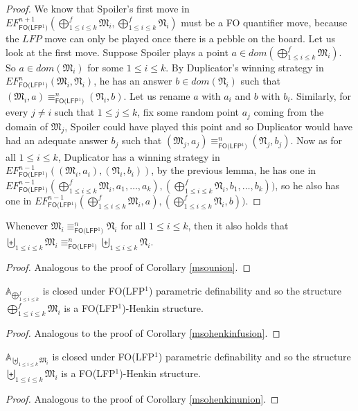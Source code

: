 \documentclass{LMCS}
\newcommand{\frM}{\mathfrak{M}}
\newcommand{\frN}{\mathfrak{N}}
\newcommand{\fo}{\textsf{FO}\xspace}
\newcommand{\folfp}{\textsf{FO(LFP$^1$)}\xspace}
\begin{document}
\begin{proof}
We know that Spoiler's first move in
$EF_\folfp^{n+1}(\bigoplus_{1\leq i\leq k}^f \frM_i,
\bigoplus_{1\leq i\leq k}^f \frN_i)$ must be a \fo
quantifier move, because the $LFP$ move can only be played once
there is a pebble on the board. Let us look at the first move.
Suppose Spoiler plays a point $a\in dom(\bigoplus_{1\leq
i\leq k}^f \frM_i)$. So $a \in dom(\frM_i)$ for some $1 \leq i
\leq k$. By Duplicator's winning strategy in $EF_\folfp^n(\frM_i,
\frN_i)$, he has an answer $b \in dom(\frN_i)$ such that
$(\frM_i,a) \equiv_\folfp^n (\frN_i,b)$. Let us rename $a$ with
$a_i$ and $b$ with $b_i$. Similarly, for every $j\neq i$ such that
$1 \leq j \leq k$, fix some random point $a_j$ coming from the
domain of $\frM_j$, Spoiler could have played this point and so
Duplicator would have had an adequate answer $b_j$ such that
$(\frM_j,a_j) \equiv_\folfp^n (\frN_j,b_j)$. Now as for all $1 \leq
i \leq k$, Duplicator has a winning strategy in
$EF_\folfp^{n-1}((\frM_i,a_i),(\frN_i,b_i))$, by the previous lemma,
he has one in $EF_\folfp^{n-1}(\bigoplus_{1\leq i\leq k}^f
\frM_i, a_1, \ldots, a_k),(\bigoplus_{1\leq i\leq k}^f
\frN_i, b_1, \ldots, b_k))$, so he also has one in
$EF_\folfp^{n-1}(\bigoplus_{1\leq i\leq k}^f \frM_i,
a),(\bigoplus_{1\leq i\leq k}^f \frN_i, b))$.
\end{proof}


\begin{cor}
Whenever $\frM_i\equiv_\folfp^n\frN_i$ for all $1 \leq i \leq k$,
then it also holds that $\biguplus_{ 1 \leq i \leq k}\frM_i\equiv_\folfp^n
\biguplus_{ 1 \leq i \leq k}\frN_i$.\label{folfpunion}
\end{cor}

\begin{proof}
Analogous to the proof of Corollary \ref{msounion}.
\end{proof}


\begin{cor}
$\mathbb{A}_{\bigoplus_{1\leq i\leq k}^f}$ is closed
under \folfp parametric definability and so the structure $\bigoplus_{1\leq i\leq k}^f\frM_i$ is a \folfp-Henkin
structure.\label{folfphenkinfusion}
\end{cor}

\begin{proof}
Analogous to the proof of Corollary \ref{msohenkinfusion}.
\end{proof}

\begin{cor}
$\mathbb{A}_{\biguplus_{ 1 \leq i \leq k} \frM_i}$ is closed
under \folfp parametric definability and so the structure $\biguplus_{ 1 \leq i \leq k} \frM_i$ is a \folfp-Henkin
structure.
\label{folfphenkinunion}
\end{cor}
\begin{proof}
Analogous to the proof of Corollary \ref{msohenkinunion}.
\end{proof}
\end{document}
